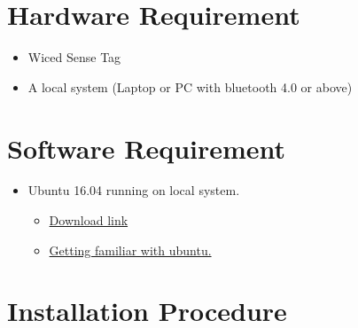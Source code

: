 \documentclass[11pt,a4paper]{article}
\begin{document}
	\section{Hardware Requirement}
	\begin{itemize}
	\item Wiced Sense Tag
	\item A local system (Laptop or PC with bluetooth 4.0 or above)
	\end{itemize}
	
	\section{Software Requirement}
	\begin{itemize}
	\item Ubuntu 16.04 running on local system.
	\begin{itemize}
	\item \href{http://www.ubuntu.com/download}{Download link}
	\item \href{http://www.makeuseof.com/tag/ubuntu-an-absolute-beginners-guide/}{Getting familiar with ubuntu.}
	\end{itemize}
	\end{itemize}
	\newpage
	\section{Installation Procedure}
	
\end{document}

